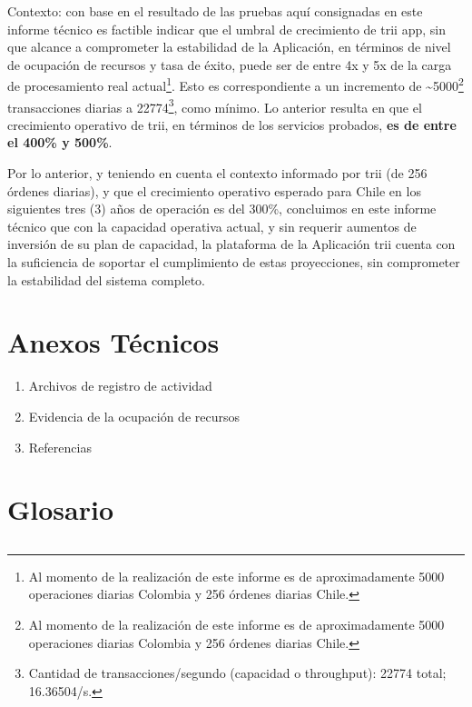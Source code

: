 \documentclass[
  paper=a4,
  ,captions=tableheading
]{scrartcl}
\providecommand{\tightlist}{%
  \setlength{\itemsep}{0pt}\setlength{\parskip}{0pt}}
\begin{document}
Contexto: con base en el resultado de las pruebas aquí consignadas en
este informe técnico es factible indicar que el umbral de crecimiento de
trii app, sin que alcance a comprometer la estabilidad de la Aplicación,
en términos de nivel de ocupación de recursos y tasa de éxito, puede ser
de entre 4x y 5x de la carga de procesamiento real actual\footnote{Al
  momento de la realización de este informe es de aproximadamente 5000
  operaciones diarias Colombia y 256 órdenes diarias Chile.}. Esto es
correspondiente a un incremento de \textasciitilde5000\footnote{Al
  momento de la realización de este informe es de aproximadamente 5000
  operaciones diarias Colombia y 256 órdenes diarias Chile.}
transacciones diarias a 22774\footnote{Cantidad de transacciones/segundo
  (capacidad o throughput): 22774 total; 16.36504/s.}, como mínimo. Lo
anterior resulta en que el crecimiento operativo de trii, en términos de
los servicios probados, \textbf{es de entre el 400\% y 500\%}.

Por lo anterior, y teniendo en cuenta el contexto informado por trii (de
256 órdenes diarias), y que el crecimiento operativo esperado para Chile
en los siguientes tres (3) años de operación es del 300\%, concluimos en
este informe técnico que con la capacidad operativa actual, y sin
requerir aumentos de inversión de su plan de capacidad, la plataforma de
la Aplicación trii cuenta con la suficiencia de soportar el cumplimiento
de estas proyecciones, sin comprometer la estabilidad del sistema
completo.

\newpage

\section{Anexos Técnicos}\label{sec:anexos-tuxe9cnicos}

\begin{enumerate}
\def\labelenumi{\arabic{enumi}.}
\tightlist
\item
  Archivos de registro de actividad
\item
  Evidencia de la ocupación de recursos
\item
  Referencias
\end{enumerate}

\newpage

\section{Glosario}\label{sec:glosario}

\subsection{}\label{sec:section}
\end{document}
